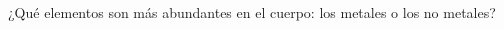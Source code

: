¿Qué elementos son más abundantes en el cuerpo: los metales o los no metales?

\begin{solutionbox}{2cm}

\end{solutionbox}
